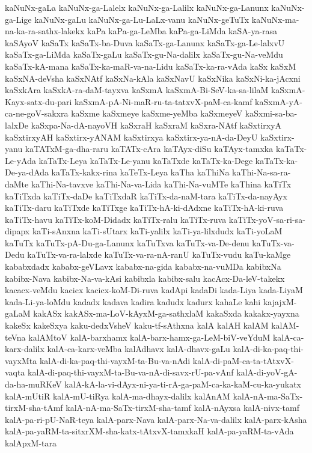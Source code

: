 {kaNuNx-gaLa
kaNuNx-ga-Lalelx
kaNuNx-ga-Lalilx
kaNuNx-ga-Lanunx
kaNuNx-ga-Lige
kaNuNx-gaLu
kaNuNx-ga-Lu-LaLx-vanu
kaNuNx-geTuTx
kaNuNx-ma-na-ka-ra-sathx-lakekx
kaPa
kaPa-ga-LeMba
kaPa-ga-LiMda
kaSA-ya-rasa
kaSAyoV
kaSaTx
kaSaTx-ba-Duva
kaSaTx-ga-Lanunx
kaSaTx-ga-Le-lalxvU
kaSaTx-ga-LiMda
kaSaTx-gaLu
kaSaTx-gu-Na-dalilx
kaSaTx-gu-Na-veMdu
kaSaTx-kA-mana
kaSaTx-ka-maR-va-na-Lidu
kaSaTx-ka-ra-vAda
kaSx
kaSxM
kaSxNA-deVsha
kaSxNAtf
kaSxNa-kAla
kaSxNavU
kaSxNika
kaSxNi-ka-jAcxni
kaSxkAra
kaSxkA-ra-daM-tayxva
kaSxmA
kaSxmA-Bi-SeV-ka-sa-lilaM
kaSxmA-Kayx-satx-du-pari
kaSxmA-pA-Ni-maR-ru-ta-tatxvX-paM-ca-kamf
kaSxmA-yA-ca-ne-goV-sakxra
kaSxme
kaSxmeye
kaSxme-yeMba
kaSxmeyeV
kaSxmi-sa-ba-lalxDe
kaSxpa-Na-dA-nayoVH
kaSxraH
kaSxraM
kaSxra-NAtf
kaSxtirxyA
kaSxtirxyAH
kaSxtirx-yANAM
kaSxtirxya
kaSxtirx-ya-nA-da-DeyU
kaSxtirx-yanu
kaTATxM-ga-dha-raru
kaTATx-cAra
kaTAyx-diSu
kaTAyx-tamxka
kaTaTx-Le-yAda
kaTaTx-Leya
kaTaTx-Le-yanu
kaTaTxde
kaTaTx-ka-Dege
kaTaTx-ka-De-ya-dAda
kaTaTx-kakx-rina
kaTeTx-Leya
kaTha
kaThiNa
kaThi-Na-sa-ra-daMte
kaThi-Na-tavxve
kaThi-Na-va-Lida
kaThi-Na-vuMTe
kaThina
kaTiTx
kaTiTxda
kaTiTx-daDe
kaTiTxdaR
kaTiTx-da-naM-tara
kaTiTx-da-nayAyx
kaTiTx-daru
kaTiTxde
kaTiTxge
kaTiTx-hA-ki-dAdxne
kaTiTx-hA-ki-ruva
kaTiTx-havu
kaTiTx-koM-Didadx
kaTiTx-ralu
kaTiTx-ruva
kaTiTx-yoV-sa-ri-sa-dipapx
kaTi-sAnxna
kaTi-sUtarx
kaTi-yalilx
kaTi-ya-lilxdudx
kaTi-yoLaM
kaTuTx
kaTuTx-pA-Du-ga-Lanunx
kaTuTxva
kaTuTx-va-De-denu
kaTuTx-va-Dedu
kaTuTx-va-ra-lalxde
kaTuTx-va-ra-nA-ranU
kaTuTx-vudu
kaTu-kaMge
kababxdadx
kababx-geVLavx
kababx-na-gida
kababx-na-vuMDa
kabibxNa
kabibx-Nava
kabibx-Na-va-kAsi
kabibxla
kabibx-salu
kacAcx-Da-leV-takekx
kacacx-veMdu
kacicx
kacicx-koM-Di-ruva
kadApi
kadaDi
kada-Liya
kada-LiyaM
kada-Li-ya-loMdu
kadadx
kadava
kadira
kadudx
kadurx
kahaLe
kahi
kajajxM-gaLaM
kakASx
kakASx-ma-LoV-kAyxM-ga-sathxlaM
kakaSxda
kakakx-yayxna
kakeSx
kakeSxya
kaku-dedxVsheV
kaku-tf-sAthxna
kalA
kalAH
kalAM
kalAM-teVna
kalAMtoV
kalA-barxhamx
kalA-barx-hamx-ga-LeM-biV-veYduM
kalA-ca-karx-dalilx
kalA-ca-karx-veMba
kalAdhavx
kalA-dhavx-gaLu
kalA-di-ka-paq-thi-vayxMta
kalA-di-ka-paq-thi-vayxM-ta-Bu-va-nAdi
kalA-di-paM-ca-ta-tAtxvX-vaqta
kalA-di-paq-thi-vayxM-ta-Bu-va-nA-di-savx-rU-pa-vAnf
kalA-di-yoV-gA-da-ha-muRKeV
kalA-kA-la-vi-dAyx-ni-ya-ti-rA-ga-paM-ca-ka-kaM-cu-ka-yukatx
kalA-mUtiR
kalA-mU-tiRya
kalA-ma-dhayx-dalilx
kalAnAM
kalA-nA-ma-SaTx-tirxM-sha-tAmf
kalA-nA-ma-SaTx-tirxM-sha-tamf
kalA-nAyxsa
kalA-nivx-tamf
kalA-pa-ri-pU-NaR-teya
kalA-parx-Nava
kalA-parx-Na-va-dalilx
kalA-parx-kAsha
kalA-pa-yaRM-ta-sitxrXM-sha-katx-tAtxvX-tamxkaH
kalA-pa-yaRM-ta-vAda
kalApxM-tara
}
